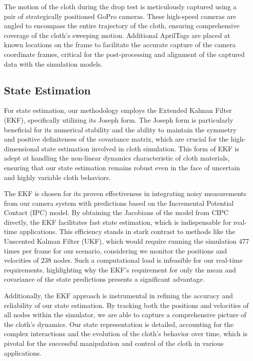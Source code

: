\documentclass[subscriptcorrection,upint,varvw,barcolor=Goldenrod3,mathalfa=cal=euler,balance,hyphenate,french,pdf-a, nofoot]{asmejour} %
\begin{document}
The motion of the cloth during the drop test is meticulously captured using a pair of strategically positioned GoPro cameras. These high-speed cameras are angled to encompass the entire trajectory of the cloth, ensuring comprehensive coverage of the cloth's sweeping motion. Additional AprilTags are placed at known locations on the frame to facilitate the accurate capture of the camera coordinate frames, critical for the post-processing and alignment of the captured data with the simulation models.


\subsection{State Estimation}
For state estimation, our methodology employs the Extended Kalman Filter (EKF), specifically utilizing its Joseph form. The Joseph form is particularly beneficial for its numerical stability and the ability to maintain the symmetry and positive definiteness of the covariance matrix, which are crucial for the high-dimensional state estimation involved in cloth simulation. This form of EKF is adept at handling the non-linear dynamics characteristic of cloth materials, ensuring that our state estimation remains robust even in the face of uncertain and highly variable cloth behaviors.

The EKF is chosen for its proven effectiveness in integrating noisy measurements from our camera system with predictions based on the Incremental Potential Contact (IPC) model. By obtaining the Jacobians of the model from CIPC directly, the EKF facilitates fast state estimation, which is indispensable for real-time applications. This efficiency stands in stark contrast to methods like the Unscented Kalman Filter (UKF), which would require running the simulation 477 times per frame for our scenario, considering we monitor the positions and velocities of 238 nodes. Such a computational load is infeasible for our real-time requirements, highlighting why the EKF's requirement for only the mean and covariance of the state predictions presents a significant advantage.

Additionally, the EKF approach is instrumental in refining the accuracy and reliability of our state estimation. By tracking both the positions and velocities of all nodes within the simulator, we are able to capture a comprehensive picture of the cloth's dynamics. Our state representation is detailed, accounting for the complex interactions and the evolution of the cloth's behavior over time, which is pivotal for the successful manipulation and control of the cloth in various applications.
\end{document}
